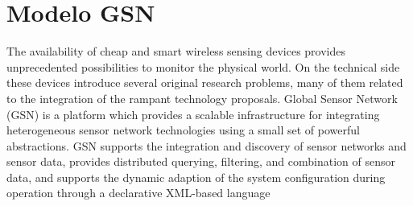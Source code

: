 \section{Modelo GSN}

\cite{LSIR-REPORT-2006-001}

The availability of cheap and smart wireless sensing devices provides unprecedented possibilities to monitor the physical world. On the technical side these devices introduce several original research problems, many of them related to the integration of the rampant technology proposals. Global Sensor Network (GSN) is a platform which provides a scalable infrastructure for integrating heterogeneous sensor network technologies using a small set of powerful abstractions. GSN supports the integration and discovery of sensor networks and sensor data, provides distributed querying, filtering, and combination of sensor data, and supports the dynamic adaption of the system configuration during operation through a declarative XML-based language